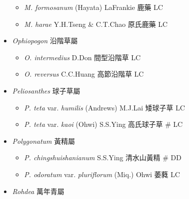 \begin{itemize}
  \begin{itemize}
        \item[] \textit{M. formosanum} (Hayata) LaFrankie  鹿藥   LC
        \item[] \textit{M. harae} Y.H.Tseng \& C.T.Chao  原氏鹿藥   LC
  \end{itemize}
 \item[] \textit{Ophiopogon} 沿階草屬
                                
  \begin{itemize}
        \item[] \textit{O. intermedius} D.Don  間型沿階草   LC
        \item[] \textit{O. reversus} C.C.Huang  高節沿階草   LC
  \end{itemize}
 \item[] \textit{Peliosanthes} 球子草屬
                                
  \begin{itemize}
        \item[] \textit{P. teta} var. \textit{humilis} (Andrews) M.J.Lai  矮球子草   LC
        \item[] \textit{P. teta} var. \textit{kaoi} (Ohwi) S.S.Ying  高氏球子草  \# LC
  \end{itemize}
 \item[] \textit{Polygonatum} 黃精屬
                                
  \begin{itemize}
        \item[] \textit{P. chingshuishanianum} S.S.Ying  清水山黃精  \# DD
        \item[] \textit{P. odoratum} var. \textit{pluriflorum} (Miq.) Ohwi  萎蕤   LC
  \end{itemize}
 \item[] \textit{Rohdea} 萬年青屬
                                

\end{itemize}

